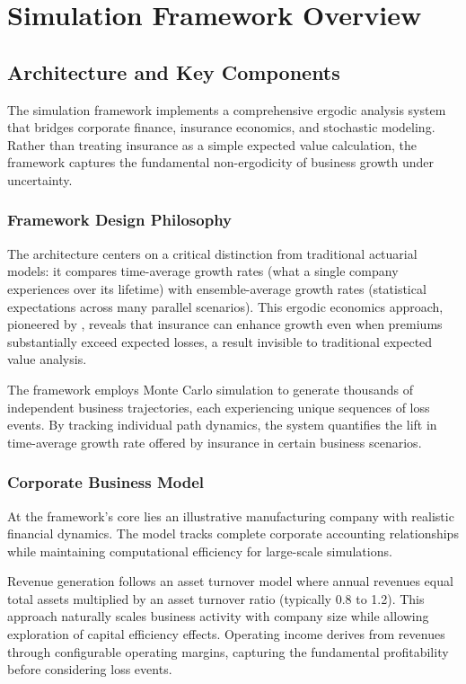 \documentclass[11pt,letterpaper]{article}
\begin{document}
\section{Simulation Framework Overview}

\subsection{Architecture and Key Components}

The simulation framework implements a comprehensive ergodic analysis system that bridges corporate finance, insurance economics, and stochastic modeling. Rather than treating insurance as a simple expected value calculation, the framework captures the fundamental non-ergodicity of business growth under uncertainty.

\subsubsection{Framework Design Philosophy}

The architecture centers on a critical distinction from traditional actuarial models: it compares time-average growth rates (what a single company experiences over its lifetime) with ensemble-average growth rates (statistical expectations across many parallel scenarios). This ergodic economics approach, pioneered by \citet{peters2019ergodicity}, reveals that insurance can enhance growth even when premiums substantially exceed expected losses, a result invisible to traditional expected value analysis.

The framework employs Monte Carlo simulation to generate thousands of independent business trajectories, each experiencing unique sequences of loss events. By tracking individual path dynamics, the system quantifies the lift in time-average growth rate offered by insurance in certain business scenarios.

\subsubsection{Corporate Business Model}

At the framework's core lies an illustrative manufacturing company with realistic financial dynamics. The model tracks complete corporate accounting relationships while maintaining computational efficiency for large-scale simulations.

Revenue generation follows an asset turnover model where annual revenues equal total assets multiplied by an asset turnover ratio (typically 0.8 to 1.2). This approach naturally scales business activity with company size while allowing exploration of capital efficiency effects. Operating income derives from revenues through configurable operating margins, capturing the fundamental profitability before considering loss events.
\end{document}
